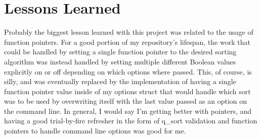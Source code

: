 \documentclass[11pt]{report}
\begin{document}
\section*{Lessons Learned}
Probably the biggest lesson learned with this project was related to the usage of function pointers. For a good portion of my repository's lifespan, the work that could be handled by setting a single function pointer to the desired sorting algorithm was instead handled by setting multiple different Boolean values explicitly on or off depending on which options where passed. This, of course, is silly, and was eventually replaced by the implementation of having a single function pointer value inside of my options struct that would handle which sort was to be used by overwriting itself with the last value passed as an option on the command line. In general, I would say I'm getting better with pointers, and having a good trial-by-fire refresher in the form of q\_sort validation and function pointers to handle command line options was good for me.
\end{document}
